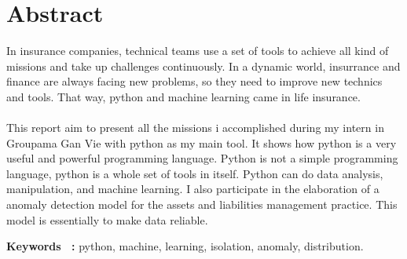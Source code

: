 \chapter*{Abstract}

In insurance companies, technical teams use a set of tools to achieve all kind of missions and take up challenges continuously. In a dynamic world, insurrance and finance are always facing new problems, so they need to improve new technics and tools. That way, python and machine learning came in life insurance. 
\\
\\
This report aim to present all the missions i accomplished during my intern in Groupama Gan Vie with python as my main tool. It shows how python is a very useful and powerful programming language. Python is not a simple programming language, python is a whole set of tools in itself. Python can do data analysis, manipulation, and machine learning. I also participate in the elaboration of a anomaly detection model for the assets and liabilities management practice. This model is essentially to make data reliable.

\begin{singlespace}
\textbf {Keywords ~:} python, machine, learning, isolation, anomaly, distribution.
\end{singlespace}

